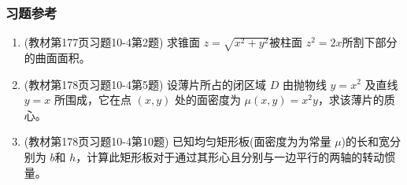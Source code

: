 \subsubsection{习题参考}
\begin{enumerate}
    \item (教材第177页习题10-4第2题) 求锥面 $z=\sqrt{x^2 + y^2}$被柱面 $z^2 = 2x$所割下部分的曲面面积。
    
    \item (教材第178页习题10-4第5题)  设薄片所占的闭区域 $D$ 由抛物线 $y=x^2$ 及直线 $y=x$ 所围成，它在点 $(x,y)$ 处的面密度为 $\mu (x,y) =x^2y$，求该薄片的质心。
    
    \item (教材第178页习题10-4第10题) 已知均匀矩形板(面密度为为常量 $\mu$)的长和宽分别为 $b$和 $h$，计算此矩形板对于通过其形心且分别与一边平行的两轴的转动惯量。
\end{enumerate}

\newpage
